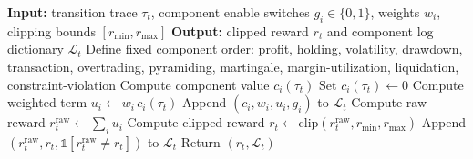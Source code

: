\begin{algorithm}[!tbp]
\caption{Per-step compositional reward computation.}
\label{alg:reward_computation}
\begin{algorithmic}[1]
\STATE \textbf{Input:} transition trace $\tau_t$, component enable switches $g_i \in \{0,1\}$,
\STATE \hspace*{1em} weights $w_i$, clipping bounds $[r_{\min},r_{\max}]$
\STATE \textbf{Output:} clipped reward $r_t$ and component log dictionary $\mathcal{L}_t$
\STATE Define fixed component order:
\STATE \hspace{1em}profit, holding, volatility, drawdown, transaction, overtrading,
\STATE \hspace{1em}pyramiding, martingale, margin-utilization, liquidation, constraint-violation
        \STATE Compute component value $c_i(\tau_t)$
    \ELSE
        \STATE Set $c_i(\tau_t) \leftarrow 0$
    \ENDIF
    \STATE Compute weighted term $u_i \leftarrow w_i\,c_i(\tau_t)$
    \STATE Append $(c_i,w_i,u_i,g_i)$ to $\mathcal{L}_t$
\ENDFOR
\STATE Compute raw reward $r_t^{\mathrm{raw}} \leftarrow \sum_i u_i$
\STATE Compute clipped reward $r_t \leftarrow \mathrm{clip}(r_t^{\mathrm{raw}}, r_{\min}, r_{\max})$
\STATE Append $(r_t^{\mathrm{raw}}, r_t, \mathbb{1}[r_t^{\mathrm{raw}} \neq r_t])$ to $\mathcal{L}_t$
\STATE Return $(r_t,\mathcal{L}_t)$
\end{algorithmic}
\end{algorithm}
